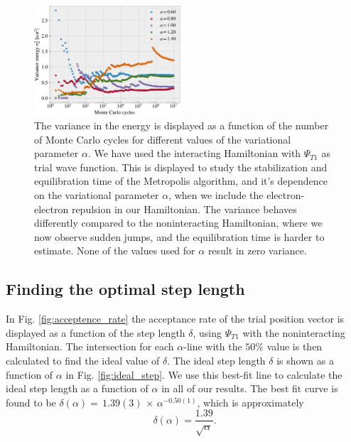 \documentclass[%
 reprint,
nofootinbib,
aps,
]{revtex4-1}
\begin{document}
\begin{figure}
  \centering
  \includegraphics[width=0.485\textwidth]{../figures/stability_variance_E1.pdf}
  \caption{The variance in the energy is displayed as a function of the number of Monte Carlo cycles for different values of the variational parameter $\alpha$. We have used the interacting Hamiltonian with $\Psi_{T1}$ as trial wave function. This is displayed to study the stabilization and equilibration time of the Metropolis algorithm, and it's dependence on the variational parameter $\alpha$, when we include the electron-electron repulsion in our Hamiltonian. The variance behaves differently compared to the noninteracting Hamiltonian, where we now observe sudden jumps, and the equilibration time is harder to estimate. None of the values used for $\alpha$ result in zero variance.}
  \label{fig:stability_variance_E1}
\end{figure}

\subsection{Finding the optimal step length}
In Fig. \vref{fig:acceptence_rate} the acceptance rate of the trial position vector is displayed as a function of the step length $\delta$, using $\Psi_{T1}$ with the noninteracting Hamiltonian. The intersection for each $\alpha$-line with the $50\%$ value is then calculated to find the ideal value of $\delta$. The ideal step length $\delta$ is shown as a function of $\alpha$ in Fig. \vref{fig:ideal_step}. We use this best-fit line to calculate the ideal step length as a function of $\alpha$ in all of our results.
The best fit curve is found to be $\delta(\alpha)=\,1.39(3)\,\times\,\alpha^{-0.50(1)}$, which is approximately
\begin{equation}
  \delta(\alpha) = \frac{1.39}{\sqrt{\alpha}}.
\end{equation}
\end{document}

